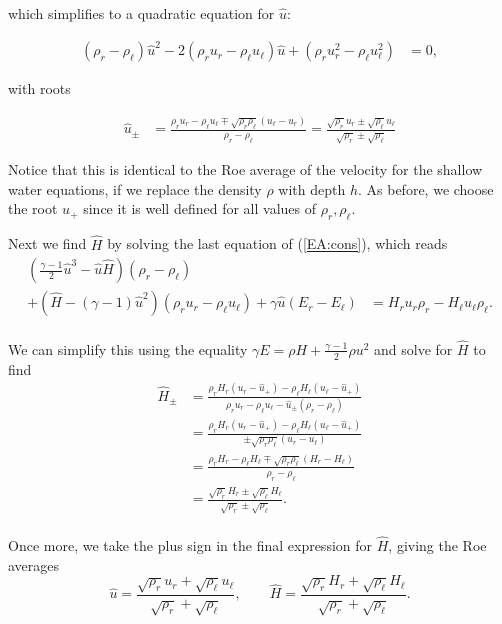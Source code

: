 \documentclass{SIAMbook2016}
\begin{document}
which simplifies to a quadratic equation for \(\hat{u}\):

\begin{align} \label{EA:u_quadratic}
    (\rho_r - \rho_\ell)\hat{u}^2 - 2(\rho_r u_r - \rho_\ell u_\ell) \hat{u} + (\rho_r u_r^2 - \rho_\ell u_\ell^2) & = 0,
\end{align}

with roots

\begin{align}
    \hat{u}_\pm & = \frac{\rho_r u_r - \rho_\ell u_\ell \mp \sqrt{\rho_r \rho_\ell} (u_\ell - u_r)}{\rho_r - \rho_\ell} = \frac{\sqrt{\rho_r} u_r \pm \sqrt{\rho_\ell} u_\ell}{\sqrt{\rho_r}\pm\sqrt{\rho_\ell}}
\end{align}

Notice that this is identical to the Roe average of the velocity for the
shallow water equations, if we replace the density \(\rho\) with depth
\(h\). As before, we choose the root \(u_+\) since it is well defined
for all values of \(\rho_r, \rho_\ell\).

Next we find \(\hat{H}\) by solving the last equation of
(\ref{EA:cons}), which reads\\
\begin{align}
    \left( \frac{\gamma-1}{2}\hat{u}^3 - \hat{u}\hat{H} \right)(\rho_r - \rho_\ell) \\ + \left( \hat{H} - (\gamma-1)\hat{u}^2 \right)(\rho_r u_r - \rho_\ell u_\ell) + \gamma \hat{u}(E_r - E_\ell) & = H_r u_r \rho_r - H_\ell u_\ell \rho_\ell.
\end{align}\\
We can simplify this using the equality
\(\gamma E = \rho H + \frac{\gamma-1}{2}\rho u^2\) and solve for
\(\hat{H}\) to find\\
\begin{align}
    \hat{H}_{\pm} & = \frac{\rho_r H_r (u_r - \hat{u}_+) - \rho_\ell H_\ell (u_\ell - \hat{u}_+)}{\rho_r u_r - \rho_\ell u_\ell - \hat{u}_\pm(\rho_r -\rho_\ell)} \\
    & = \frac{\rho_r H_r (u_r - \hat{u}_+) - \rho_\ell H_\ell (u_\ell - \hat{u}_+)}{\pm\sqrt{\rho_r \rho_\ell}(u_r-u_\ell)} \\
    & = \frac{\rho_r H_r - \rho_\ell H_\ell \mp\sqrt{\rho_r \rho_\ell}(H_r - H_\ell)}{\rho_r - \rho_\ell} \\
    & = \frac{\sqrt{\rho_r}H_r \pm \sqrt{\rho_\ell} H_\ell}{\sqrt{\rho_r}\pm\sqrt{\rho_\ell}}.
\end{align}\\
Once more, we take the plus sign in the final expression for
\(\hat{H}\), giving the Roe averages \[
\hat{u} = \frac{\sqrt{\rho_r} u_r + \sqrt{\rho_\ell} u_\ell}{\sqrt{\rho_r} + \sqrt{\rho_\ell}},
\qquad \hat{H} = \frac{\sqrt{\rho_r}H_r + \sqrt{\rho_\ell} H_\ell}{\sqrt{\rho_r} + \sqrt{\rho_\ell}}.
\]
\end{document}
